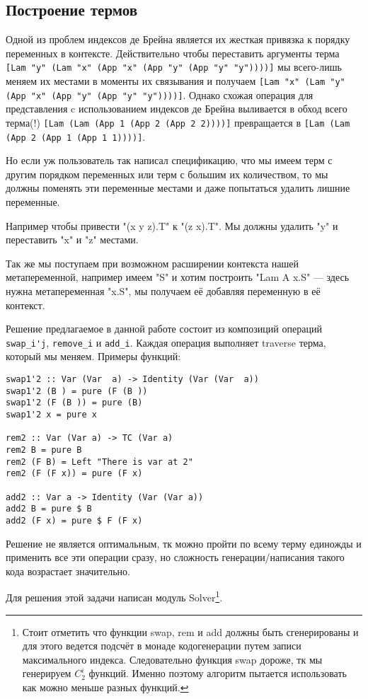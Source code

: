 \subsection{Построение термов}\label{build_exp}
Одной из проблем индексов де Брейна является их жесткая привязка к порядку переменных в контексте. Действительно чтобы переставить аргументы терма \lstinline{[Lam "y" (Lam "x" (App "x" (App "y" (App "y" "y"))))]} мы всего-лишь меняем их местами в моменты их связывания и получаем \lstinline{[Lam "x" (Lam "y" (App "x" (App "y" (App "y" "y"))))]}. Однако схожая операция для представления c использованием индексов де Брейна выливается в обход всего терма(!) \lstinline{[Lam (Lam (App 1 (App 2 (App 2 2))))]} превращается в \lstinline{[Lam (Lam (App 2 (App 1 (App 1 1))))]}.

Но если уж пользователь так написал спецификацию, что мы имеем терм с другим порядком переменных или терм с большим их количеством, то мы должны поменять эти переменные местами и даже попытаться удалить лишние переменные.

Например чтобы привести "(x y z).T" к "(z x).T". Мы должны удалить "y" и переставить "x" и "z" местами.

Так же мы поступаем при возможном расширении контекста нашей метапеременной, например имеем "S" и хотим построить "Lam A x.S" --- здесь нужна метапеременная "x.S", мы получаем её добавляя переменную в её контекст.

Решение предлагаемое в данной работе состоит из композиций операций \lstinline{swap_i'j}, \lstinline{remove_i} и \lstinline{add_i}. Каждая операция выполняет traverse терма, который мы меняем. Примеры функций:
\begin{lstlisting}
swap1'2 :: Var (Var  a) -> Identity (Var (Var  a))
swap1'2 (B ) = pure (F (B ))
swap1'2 (F (B )) = pure (B)
swap1'2 x = pure x

rem2 :: Var (Var a) -> TC (Var a)
rem2 B = pure B
rem2 (F B) = Left "There is var at 2"
rem2 (F (F x)) = pure (F x)

add2 :: Var a -> Identity (Var (Var a))
add2 B = pure $ B
add2 (F x) = pure $ F (F x)
\end{lstlisting}

Решение не является оптимальным, тк можно пройти по всему терму единожды и применить все эти операции сразу, но сложность генерации/написания такого кода возрастает значительно.

Для решения этой задачи написан модуль Solver\footnote{Стоит отметить что функции swap, rem и add должны быть сгенерированы и для этого ведется подсчёт в монаде кодогенерации путем записи максимального индекса. Следовательно функция swap дороже, тк мы генерируем $C_2^i$ функций. Именно поэтому алгоритм пытается использовать как можно меньше разных функций.}.

